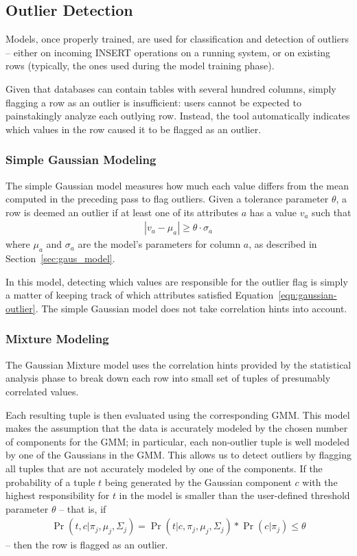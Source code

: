 \subsection{Outlier Detection}
\label{sec:outlier-detection}

Models, once properly trained, are used for classification and detection of outliers -- either on incoming INSERT operations on a running system, or on existing rows (typically, the ones used during the model training phase). %

Given that databases can contain tables with several hundred columns, simply flagging a row as an outlier is insufficient: users cannot be expected to painstakingly analyze each outlying row. Instead, the tool automatically indicates which values in the row caused it to be flagged as an outlier.

\subsubsection{Simple Gaussian Modeling}
The simple Gaussian model measures how much each value differs from the mean computed in the preceding pass to flag outliers. Given a tolerance parameter $\theta$, a row is deemed an outlier if at least one of its attributes $a$ has a value $v_a$ such that
\begin{align}
  |v_a - \mu_a| \ge \theta \cdot \sigma_a
  \label{eqn:gaussian-outlier}
\end{align}
where $\mu_a$ and $\sigma_a$ are the model's parameters for column $a$, as described in Section~\ref{sec:gaus_model}.

In this model, detecting which values are responsible for the outlier flag is simply a matter of keeping track of which attributes satisfied Equation~\ref{eqn:gaussian-outlier}. The simple Gaussian model does not take correlation hints into account.

\subsubsection{Mixture Modeling}
The Gaussian Mixture model uses the correlation hints provided by the statistical analysis phase to break down each row into small set of tuples of presumably correlated values.

Each resulting tuple is then evaluated using the corresponding GMM. This model makes the assumption that the data is accurately modeled by the chosen number of components for the GMM; in particular, each non-outlier tuple is well modeled by one of the Gaussians in the GMM. This allows us to detect outliers by flagging all tuples that are not accurately modeled by one of the components. If the probability of a tuple $t$ being generated by the Gaussian component $c$ with the highest responsibility for $t$ in the model is smaller than the user-defined threshold parameter $\theta$ -- that is, if
\begin{align}
  \Pr(t, c | \pi_j, \mu_j, \Sigma_j) = \Pr(t | c, \pi_j, \mu_j, \Sigma_j) * \Pr(c | \pi_j)  \leq \theta
  \label{eqn:mixture-outlier}
\end{align}
 -- then the row is flagged as an outlier.

